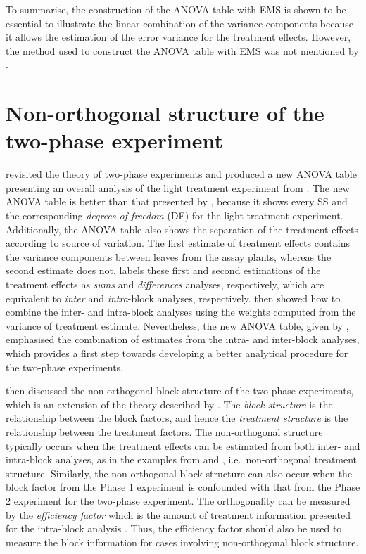\documentclass[11pt,a4paper]{article}
\begin{document}
To summarise, the construction of the ANOVA table with EMS is shown to be essential to illustrate the linear combination of the variance components because it allows the estimation of the error variance for the treatment effects. However, the method used to construct the ANOVA table with EMS was not mentioned by \cite{McIntyre1955}.
 
\section{Non-orthogonal structure of the two-phase experiment}
\cite{Curnow1959} revisited the theory of two-phase experiments and produced a new ANOVA table presenting an overall analysis of the light treatment experiment from \citeauthor{McIntyre1955}. The new ANOVA table is better than that presented by \cite{McIntyre1955}, because it shows every SS and the corresponding \emph{degrees of freedom} (DF) for the light treatment experiment. Additionally, the ANOVA table also shows the separation of the treatment effects according to source of variation. The first estimate of treatment effects contains the variance components between leaves from the assay plants, whereas the second estimate does not. \cite{Curnow1959} labels these first and second estimations of the treatment effects as \emph{sums} and \emph{differences} analyses, respectively, which are equivalent to \emph{inter} and \emph{intra}-block analyses, respectively. \cite{Curnow1959} then showed how to combine the inter- and intra-block analyses using the weights computed from the variance of treatment estimate. Nevertheless, the new ANOVA table, given by \cite{Curnow1959}, emphasised the combination of estimates from the intra- and inter-block analyses, which provides a first step towards developing a better analytical procedure for the two-phase experiments. 

\cite{Wood1988} then discussed the non-orthogonal block structure of the two-phase experiments, which is an extension of the theory described by \cite{Curnow1959}. The \emph{block structure} is the relationship between the block factors, and hence the \emph{treatment structure} is the relationship between the treatment factors. The non-orthogonal structure typically occurs when the treatment effects can be estimated from both inter- and intra-block analyses, as in the examples from \cite{McIntyre1955} and \cite{Curnow1959}, i.e.\ non-orthogonal treatment structure. Similarly, the non-orthogonal block structure can also occur when the block factor from the Phase 1 experiment is confounded with that from the Phase 2 experiment for the two-phase experiment. The orthogonality can be measured by the \emph{efficiency factor} which is the amount of treatment information presented for the intra-block analysis \citep{Yates1936}. Thus, the efficiency factor should also be used to measure the block information for cases involving non-orthogonal block structure. 
\end{document}
